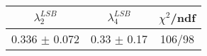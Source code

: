 \begin{tabular}{c|c||c}
$\lambda_{2}^{LSB}$ & $\lambda_4^{LSB}$ & $\chi^{2}$/ndf \\
\hline
0.336 $\pm$ 0.072 & 0.33 $\pm$ 0.17 & 106/98\\
\end{tabular}
